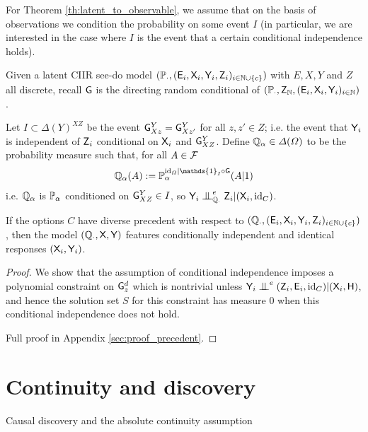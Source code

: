 For Theorem \ref{th:latent_to_observable}, we assume that on the basis of observations we condition the probability on some event $I$ (in particular, we are interested in the case where $I$ is the event that a certain conditional independence holds).

\begin{theorem}\label{th:latent_to_observable}
Given a latent CIIR see-do model $(\mathbb{P}_\cdot,(\mathsf{E}_i,\mathsf{X}_i,\mathsf{Y}_i,\mathsf{Z}_i)_{i\in\mathbb{N}\cup\{c\}})$ with $E,X,Y$ and $Z$ all discrete, recall $\mathsf{G}$ is the directing random conditional of $(\mathbb{P}_\cdot,\mathsf{Z}_{\mathbb{N}},(\mathsf{E}_i,\mathsf{X}_i,\mathsf{Y}_i)_{i\in \mathbb{N}})$.

Let $I\subset \Delta(Y)^{XZ}$ be the event $\mathsf{G}^Y_{Xz}=\mathsf{G}^Y_{Xz'}$ for all $z,z'\in Z$; i.e. the event that $\mathsf{Y}_i$ is independent of $\mathsf{Z}_i$ conditional on $\mathsf{X}_i$ and $\mathsf{G}^Y_{XZ}$. Define $\mathbb{Q}_\alpha\in \Delta(\Omega)$ to be the probability measure such that, for all $A\in \mathcal{F}$
\begin{align}
\prob{Q}_\alpha(A) := \prob{P}_\alpha^{\mathrm{id}_\Omega|\mathds{1}_I\circ \RV{G}}(A|1)
\end{align}
i.e. $\mathbb{Q}_\alpha$ is $\mathbb{P}_\alpha$ conditioned on $\mathsf{G}^Y_{XZ}\in I$, so $\RV{Y}_i\CI^e_{\prob{Q}_\cdot} \RV{Z}_i|(\RV{X}_i,\mathrm{id}_C)$.

If the options $C$ have diverse precedent with respect to $(\mathbb{Q}_\cdot,(\mathsf{E}_i,\mathsf{X}_i,\mathsf{Y}_i,\mathsf{Z}_i)_{i\in\mathbb{N}\cup\{c\}})$, then the model $(\mathbb{Q}_\cdot,\mathsf{X},\mathsf{Y})$ features conditionally independent and identical responses $(\mathsf{X}_i,\mathsf{Y}_i)$.
\end{theorem}

\begin{proof}
We show that the assumption of conditional independence imposes a polynomial constraint on $\mathsf{G}^d_z$ which is nontrivial unless $\RV{Y}_i\CI^e (\RV{Z}_i,\RV{E}_i,\text{id}_C)|(\RV{X}_i,\RV{H})$, and hence the solution set $S$ for this constraint has measure 0 when this conditional independence does not hold.

Full proof in Appendix \ref{sec:proof_precedent}.
\end{proof}

\section{Continuity and discovery}{Causal discovery and the absolute continuity assumption}

